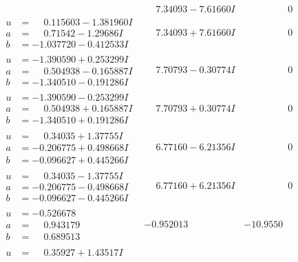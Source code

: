 \documentclass[1p]{elsarticle_modified}
\theoremstyle{definition}
\begin{document}
$$\begin{array}{c|c|c}
 & \phantom{-}7.34093 - 7.61660 I & \phantom{-0.000000 } 0 \\ \hline\begin{aligned}
u &= \phantom{-}0.115603 - 1.381960 I \\
a &= \phantom{-}0.71542 - 1.29686 I \\
b &= -1.037720 - 0.412533 I\end{aligned}
 & \phantom{-}7.34093 + 7.61660 I & \phantom{-0.000000 } 0 \\ \hline\begin{aligned}
u &= -1.390590 + 0.253299 I \\
a &= \phantom{-}0.504938 - 0.165887 I \\
b &= -1.340510 - 0.191286 I\end{aligned}
 & \phantom{-}7.70793 - 0.30774 I & \phantom{-0.000000 } 0 \\ \hline\begin{aligned}
u &= -1.390590 - 0.253299 I \\
a &= \phantom{-}0.504938 + 0.165887 I \\
b &= -1.340510 + 0.191286 I\end{aligned}
 & \phantom{-}7.70793 + 0.30774 I & \phantom{-0.000000 } 0 \\ \hline\begin{aligned}
u &= \phantom{-}0.34035 + 1.37755 I \\
a &= -0.206775 + 0.498668 I \\
b &= -0.096627 + 0.445266 I\end{aligned}
 & \phantom{-}6.77160 - 6.21356 I & \phantom{-0.000000 } 0 \\ \hline\begin{aligned}
u &= \phantom{-}0.34035 - 1.37755 I \\
a &= -0.206775 - 0.498668 I \\
b &= -0.096627 - 0.445266 I\end{aligned}
 & \phantom{-}6.77160 + 6.21356 I & \phantom{-0.000000 } 0 \\ \hline\begin{aligned}
u &= -0.526678\phantom{ +0.000000I} \\
a &= \phantom{-}0.943179\phantom{ +0.000000I} \\
b &= \phantom{-}0.689513\phantom{ +0.000000I}\end{aligned}
 & -0.952013\phantom{ +0.000000I} & -10.9550\phantom{ +0.000000I} \\ \hline\begin{aligned}
u &= \phantom{-}0.35927 + 1.43517 I \\

\end{aligned}
\end{array}$$
\end{document}
